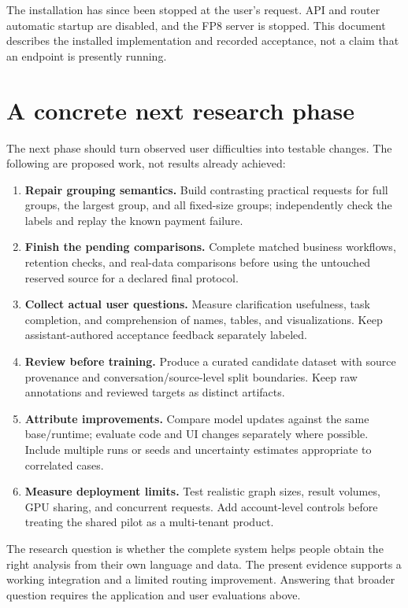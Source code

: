 \documentclass[11pt,a4paper]{article}
\begin{document}
The installation has since been stopped at the user's request. API and router
automatic startup are disabled, and the FP8 server is stopped. This document
describes the installed implementation and recorded acceptance, not a claim
that an endpoint is presently running.

\section{A concrete next research phase}

The next phase should turn observed user difficulties into testable changes.
The following are proposed work, not results already achieved:

\begin{enumerate}
\item \textbf{Repair grouping semantics.} Build contrasting practical requests
  for full groups, the largest group, and all fixed-size groups; independently
  check the labels and replay the known payment failure.
\item \textbf{Finish the pending comparisons.} Complete matched business
  workflows, retention checks, and real-data comparisons before using the
  untouched reserved source for a declared final protocol.
\item \textbf{Collect actual user questions.} Measure clarification usefulness,
  task completion, and comprehension of names, tables, and visualizations.
  Keep assistant-authored acceptance feedback separately labeled.
\item \textbf{Review before training.} Produce a curated candidate dataset with
  source provenance and conversation/source-level split boundaries. Keep raw
  annotations and reviewed targets as distinct artifacts.
\item \textbf{Attribute improvements.} Compare model updates against the same
  base/runtime; evaluate code and UI changes separately where possible. Include
  multiple runs or seeds and uncertainty estimates appropriate to correlated cases.
\item \textbf{Measure deployment limits.} Test realistic graph sizes, result
  volumes, GPU sharing, and concurrent requests. Add account-level controls
  before treating the shared pilot as a multi-tenant product.
\end{enumerate}

The research question is whether the complete system helps people obtain the
right analysis from their own language and data. The present evidence supports
a working integration and a limited routing improvement. Answering that broader
question requires the application and user evaluations above.
\end{document}
